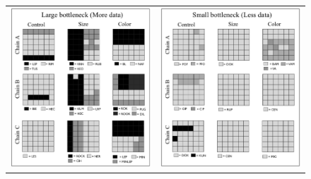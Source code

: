 \documentclass{apa}
\begin{document}
\begin{figure}
\begin{center}
\begin{tabular}{cc}
\includegraphics[scale=0.4]{largebottleneckall3.eps} &
\includegraphics[scale=0.4]{smallbottleneck2.eps} \\

\end{tabular}
\end{center}
\end{figure}
\end{document}
